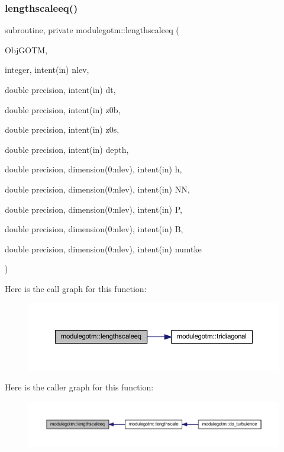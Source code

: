 \subsubsection{\texorpdfstring{lengthscaleeq()}{lengthscaleeq()}}
{\footnotesize\ttfamily subroutine, private modulegotm\+::lengthscaleeq (\begin{DoxyParamCaption}\item[{}]{Obj\+G\+O\+TM,  }\item[{integer, intent(in)}]{nlev,  }\item[{double precision, intent(in)}]{dt,  }\item[{double precision, intent(in)}]{z0b,  }\item[{double precision, intent(in)}]{z0s,  }\item[{double precision, intent(in)}]{depth,  }\item[{double precision, dimension(0\+:nlev), intent(in)}]{h,  }\item[{double precision, dimension(0\+:nlev), intent(in)}]{NN,  }\item[{double precision, dimension(0\+:nlev), intent(in)}]{P,  }\item[{double precision, dimension(0\+:nlev), intent(in)}]{B,  }\item[{double precision, dimension(0\+:nlev), intent(in)}]{numtke }\end{DoxyParamCaption})\hspace{0.3cm}{\ttfamily [private]}}

Here is the call graph for this function\+:\nopagebreak
\begin{figure}[H]
\begin{center}
\leavevmode
\includegraphics[width=350pt]{namespacemodulegotm_a82edc4e2eec49fb4f24fc31918908aef_cgraph}
\end{center}
\end{figure}
Here is the caller graph for this function\+:\nopagebreak
\begin{figure}[H]
\begin{center}
\leavevmode
\includegraphics[width=350pt]{namespacemodulegotm_a82edc4e2eec49fb4f24fc31918908aef_icgraph}
\end{center}
\end{figure}
\mbox{\label{namespacemodulegotm_a2ac21e06e59e99b089466cd065b15ca3}} 
